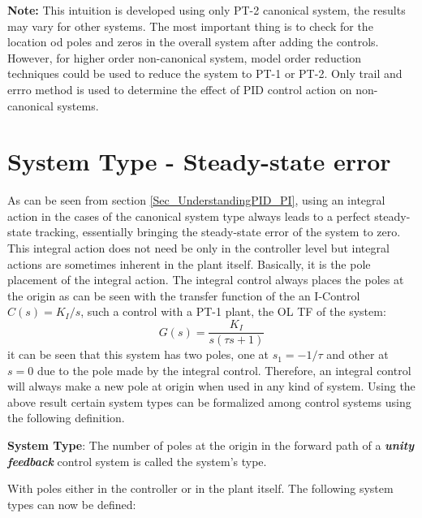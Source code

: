 \textbf{Note:} This intuition is developed using only PT-2 canonical system, the results may vary for other systems. The most important thing is to check for the location od poles and zeros in the overall system after adding the controls. However, for higher order non-canonical system, model order reduction techniques could be used to reduce the system to PT-1 or PT-2. Only trail and errro method is used to determine the effect of PID control action on non-canonical systems.

\section{System Type - Steady-state error}

As can be seen from section \ref{Sec_UnderstandingPID_PI}, using an integral action in the cases of the canonical system type always leads to a perfect steady-state tracking, essentially bringing the steady-state error of the system to zero. This integral action does not need be only in the controller level but integral actions are sometimes inherent in the plant itself. Basically, it is the pole placement of the integral action. The integral control always places the poles at the origin as can be seen with the transfer function of the an I-Control $C(s) = K_I / s$, such a control with a PT-1 plant, the OL TF of the system:
\begin{equation}
	G(s) = \frac{K_I}{s(\tau s + 1)}
\end{equation}
it can be seen that this system has two poles, one at $s_1 = -1/\tau$ and other at $s = 0$ due to the pole made by the integral control. Therefore, an integral control will always make a new pole at origin when used in any kind of system. Using the above result certain system types can be formalized among control systems using the following definition.

\textbf{System Type}: The number of poles at the origin in the forward path of a \textbf{\textit{unity feedback}} control system is called the system's type.

With poles either in the controller or in the plant itself. The following system types can now be defined:

